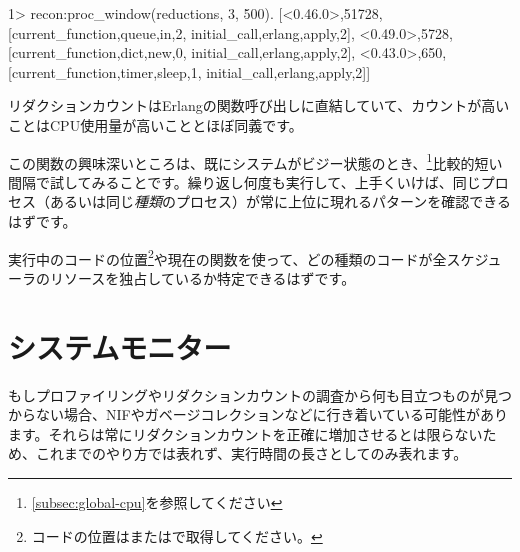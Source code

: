 \begin{VerbatimEshell}
1> recon:proc_window(reductions, 3, 500).
[{<0.46.0>,51728,
  [{current_function,{queue,in,2}},
   {initial_call,{erlang,apply,2}}]},
 {<0.49.0>,5728,
  [{current_function,{dict,new,0}},
   {initial_call,{erlang,apply,2}}]},
 {<0.43.0>,650,
  [{current_function,{timer,sleep,1}},
   {initial_call,{erlang,apply,2}}]}]
\end{VerbatimEshell}

リダクションカウントはErlangの関数呼び出しに直結していて、カウントが高いことはCPU使用量が高いこととほぼ同義です。

この関数の興味深いところは、既にシステムがビジー状態のとき、\footnote{\ref{subsec:global-cpu}を参照してください}比較的短い間隔で試してみることです。繰り返し何度も実行して、上手くいけば、同じプロセス（あるいは同じ\emph{種類}のプロセス）が常に上位に現れるパターンを確認できるはずです。

実行中のコードの位置\footnote{コードの位置はまたはで取得してください。}や現在の関数を使って、どの種類のコードが全スケジューラのリソースを独占しているか特定できるはずです。

\section{システムモニター}
\label{sec:cpu-system-monitors}

もしプロファイリングやリダクションカウントの調査から何も目立つものが見つからない場合、NIFやガベージコレクションなどに行き着いている可能性があります。それらは常にリダクションカウントを正確に増加させるとは限らないため、これまでのやり方では表れず、実行時間の長さとしてのみ表れます。

